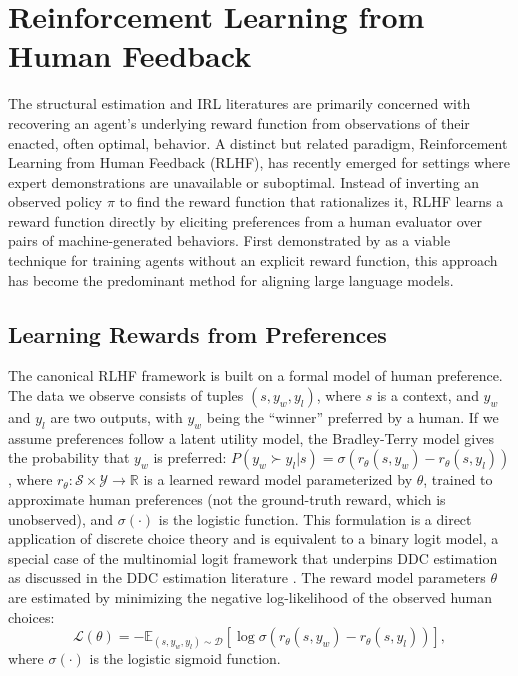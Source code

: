 \section{Reinforcement Learning from Human Feedback}
\label{sec:rlhf}

The structural estimation and IRL literatures are primarily concerned with recovering an agent's underlying reward function from observations of their enacted, often optimal, behavior. A distinct but related paradigm, Reinforcement Learning from Human Feedback (RLHF), has recently emerged for settings where expert demonstrations are unavailable or suboptimal. Instead of inverting an observed policy $\pi$ to find the reward function that rationalizes it, RLHF learns a reward function directly by eliciting preferences from a human evaluator over pairs of machine-generated behaviors. First demonstrated by \citet{christiano:2017} as a viable technique for training agents without an explicit reward function, this approach has become the predominant method for aligning large language models.

\subsection{Learning Rewards from Preferences}

The canonical RLHF framework is built on a formal model of human preference. The data we observe consists of tuples $(s, y_w, y_l)$, where $s$ is a context, and $y_w$ and $y_l$ are two outputs, with $y_w$ being the ``winner'' preferred by a human. If we assume preferences follow a latent utility model, the Bradley-Terry model gives the probability that $y_w$ is preferred: $P(y_w \succ y_l | s) = \sigma(r_\theta(s, y_w) - r_\theta(s, y_l))$, where $r_\theta: \mathcal{S} \times \mathcal{Y} \to \mathbb{R}$ is a learned reward model parameterized by $\theta$, trained to approximate human preferences (not the ground-truth reward, which is unobserved), and $\sigma(\cdot)$ is the logistic function. This formulation is a direct application of discrete choice theory and is equivalent to a binary logit model, a special case of the multinomial logit framework \citep{mcfadden:1973} that underpins DDC estimation as discussed in the DDC estimation literature \citep{mcfadden:1973}. The reward model parameters $\theta$ are estimated by minimizing the negative log-likelihood of the observed human choices:
\begin{equation}
    \mathcal{L}(\theta) = -\mathbb{E}_{(s, y_w, y_l) \sim \mathcal{D}} \left[ \log \sigma \left( r_\theta(s, y_w) - r_\theta(s, y_l) \right) \right],
\label{eq:rlhf_loss}
\end{equation}
where $\sigma(\cdot)$ is the logistic sigmoid function.

